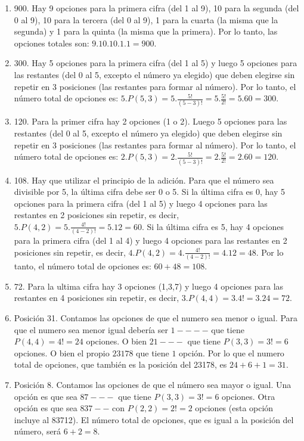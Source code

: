 \documentclass[a4paper]{article}
\begin{document}
\begin{enumerate}
\begin{enumerate} [label=(\alph*)]
		\item 900. Hay 9 opciones para la primera cifra (del 1 al 9), 10 para la segunda (del 0 al 9), 10 para la tercera (del 0 al 9), 1 para la cuarta (la misma que la segunda) y 1 para la quinta (la misma que la primera). Por lo tanto, las opciones totales son: $9.10.10.1.1=900$.
		\item 300. Hay 5 opciones para la primera cifra (del 1 al 5) y luego 5 opciones para las restantes (del 0 al 5, excepto el número ya elegido) que deben elegirse sin repetir en 3 posiciones (las restantes para formar al número). Por lo tanto, el número total de opciones es: $5.P(5,3)= 5. \frac{5!}{(5-3)!}= 5. \frac{5!}{2!} = 5.60=300$.
		\item 120. Para la primer cifra hay 2 opciones (1 o 2). Luego 5 opciones para las restantes (del 0 al 5, excepto el número ya elegido) que deben elegirse sin repetir en 3 posiciones (las restantes para formar al número). Por lo tanto, el número total de opciones es: $2.P(5,3)= 2. \frac{5!}{(5-3)!}= 2. \frac{5!}{2!} = 2.60=120$.
		\item 108. Hay que utilizar el principio de la adición. Para que el número sea divisible por 5, la última cifra debe ser 0 o 5. Si la última cifra es 0, hay 5 opciones para la primera cifra (del 1 al 5) y luego 4 opciones para las restantes en 2 posiciones sin repetir, es decir, $5.P(4,2)=5.\frac{4!}{(4-2)!}=5.12=60$. Si la última cifra es 5, hay 4 opciones para la primera cifra (del 1 al 4) y luego 4 opciones para las restantes en 2 posiciones sin repetir, es decir, $4.P(4,2)=4.\frac{4!}{(4-2)!}=4.12=48$. Por lo tanto, el número total de opciones es: $60+48=108$.
		\item 72. Para la ultima cifra hay 3 opciones (1,3,7) y luego 4 opciones para las restantes en 4 posiciones sin repetir, es decir, $3.P(4,4)=3.4!=3.24=72$.
		\item Posición 31. Contamos las opciones de que el numero sea menor o igual. Para que el numero sea menor igual debería ser $1----$ que tiene $P(4,4)=4!=24$ opciones. O bien $21---$ que tiene $P(3,3)=3!=6$ opciones. O bien el propio $23178$ que tiene $1$ opción. Por lo que el numero total de opciones, que también es la posición del 23178, es $24+6+1=31$.
		\item Posición 8. Contamos las opciones de que el número sea mayor o igual. Una opción es que sea $87---$ que tiene $P(3,3)=3!=6$ opciones. Otra opción es que sea $837--$ con $P(2,2)=2!=2$ opciones (esta opción incluye al 83712). El número total de opciones, que es igual a la posición del número, será $6+2=8$.

\end{enumerate}
\end{enumerate}
\end{document}
